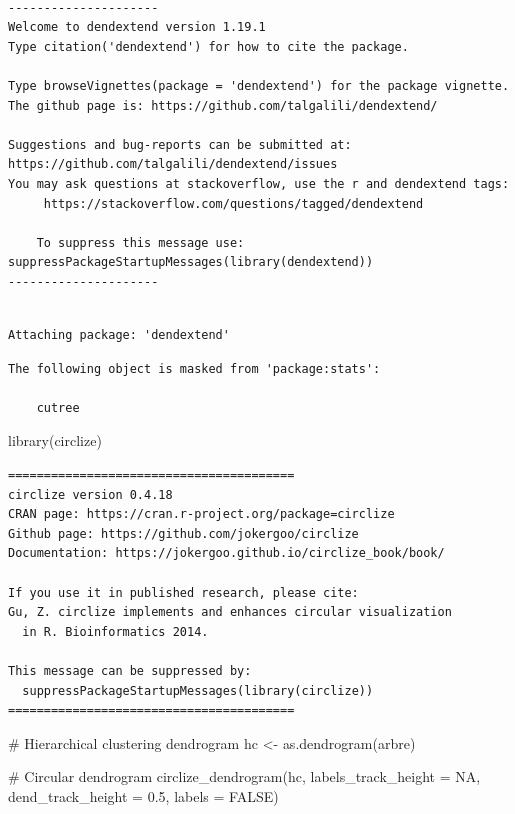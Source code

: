 \documentclass{article}
\newenvironment{Shaded}{\begin{snugshade}}{\end{snugshade}}
\newcommand{\AttributeTok}[1]{\textcolor[rgb]{0.40,0.45,0.13}{#1}}
\newcommand{\CommentTok}[1]{\textcolor[rgb]{0.37,0.37,0.37}{#1}}
\newcommand{\ConstantTok}[1]{\textcolor[rgb]{0.56,0.35,0.01}{#1}}
\newcommand{\FloatTok}[1]{\textcolor[rgb]{0.68,0.00,0.00}{#1}}
\newcommand{\FunctionTok}[1]{\textcolor[rgb]{0.28,0.35,0.67}{#1}}
\newcommand{\NormalTok}[1]{\textcolor[rgb]{0.00,0.23,0.31}{#1}}
\newcommand{\OtherTok}[1]{\textcolor[rgb]{0.00,0.23,0.31}{#1}}
\begin{document}
\begin{verbatim}

---------------------
Welcome to dendextend version 1.19.1
Type citation('dendextend') for how to cite the package.

Type browseVignettes(package = 'dendextend') for the package vignette.
The github page is: https://github.com/talgalili/dendextend/

Suggestions and bug-reports can be submitted at: https://github.com/talgalili/dendextend/issues
You may ask questions at stackoverflow, use the r and dendextend tags: 
     https://stackoverflow.com/questions/tagged/dendextend

    To suppress this message use:  suppressPackageStartupMessages(library(dendextend))
---------------------
\end{verbatim}

\begin{verbatim}

Attaching package: 'dendextend'
\end{verbatim}

\begin{verbatim}
The following object is masked from 'package:stats':

    cutree
\end{verbatim}

\begin{Shaded}
\begin{Highlighting}[]
\FunctionTok{library}\NormalTok{(circlize)}
\end{Highlighting}
\end{Shaded}

\begin{verbatim}
========================================
circlize version 0.4.18
CRAN page: https://cran.r-project.org/package=circlize
Github page: https://github.com/jokergoo/circlize
Documentation: https://jokergoo.github.io/circlize_book/book/

If you use it in published research, please cite:
Gu, Z. circlize implements and enhances circular visualization
  in R. Bioinformatics 2014.

This message can be suppressed by:
  suppressPackageStartupMessages(library(circlize))
========================================
\end{verbatim}

\begin{Shaded}
\begin{Highlighting}[]
\CommentTok{\# Hierarchical clustering dendrogram}
\NormalTok{hc }\OtherTok{\textless{}{-}} \FunctionTok{as.dendrogram}\NormalTok{(arbre)}

\CommentTok{\# Circular dendrogram}
\FunctionTok{circlize\_dendrogram}\NormalTok{(hc,}
                    \AttributeTok{labels\_track\_height =} \ConstantTok{NA}\NormalTok{,}
                    \AttributeTok{dend\_track\_height =} \FloatTok{0.5}\NormalTok{,}
                    \AttributeTok{labels =} \ConstantTok{FALSE}\NormalTok{)}
\end{Highlighting}
\end{Shaded}
\end{document}
